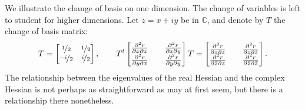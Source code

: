 \documentclass[12pt,openany]{book}
\newcommand{\C}{{\mathbb{C}}}
\theoremstyle{plain}
\theoremstyle{remark}
\theoremstyle{definition}
\theoremstyle{exercise}
\theoremstyle{example}
\begin{document}
We illustrate the change of basis on one dimension.  The change of
variables is left to student for higher dimensions.  Let $z =
x+iy$ be in $\C$, and denote by $T$ the change of basis matrix:
\begin{equation*}
T = 
\begin{bmatrix}
\nicefrac{1}{2} & \nicefrac{1}{2} \\
\nicefrac{-i}{2} & \nicefrac{i}{2}
\end{bmatrix}
,
\qquad
T^t
\begin{bmatrix}
\frac{\partial^2 r}{\partial x \partial x} &&
\frac{\partial^2 r}{\partial x \partial y}
\\
\frac{\partial^2 r}{\partial y \partial x} &&
\frac{\partial^2 r}{\partial y \partial y}
\end{bmatrix}
T
=
\begin{bmatrix}
\frac{\partial^2 r}{\partial z \partial z} &&
\frac{\partial^2 r}{\partial z \partial \bar{z}}
\\
\frac{\partial^2 r}{\partial \bar{z} \partial z} &&
\frac{\partial^2 r}{\partial \bar{z} \partial \bar{z}}
\end{bmatrix}
.
\end{equation*}
The relationship between the eigenvalues of the real Hessian and the complex
Hessian is not perhaps as straightforward as may at first seem, but there is
a relationship there nonetheless.
\end{document}
